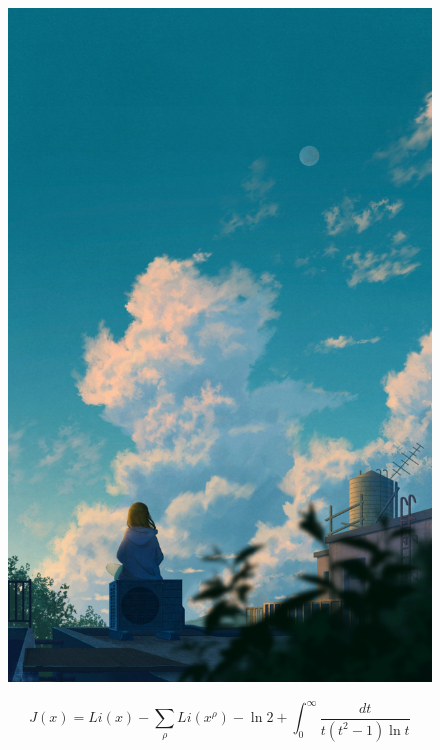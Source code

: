 \documentclass[UTF8]{ctexart}
\begin{document}
\begin{figure}[H]
	\centering
	\includegraphics{img/88833228_p0.jpg}
\end{figure}

\begin{equation}
J(x)=L i(x)-\sum_{\rho} L i\left(x^{\rho}\right)-\ln 2+\int_{0}^{\infty} \frac{d t}{t\left(t^{2}-1\right) \ln t}
\end{equation}
\end{document}

